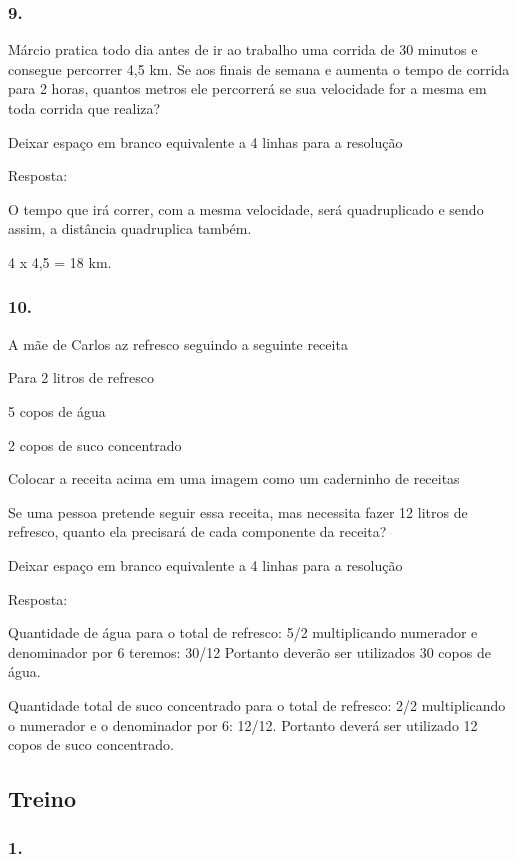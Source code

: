 \subsubsection{9.}\label{section-125}

Márcio pratica todo dia antes de ir ao trabalho uma corrida de 30
minutos e consegue percorrer 4,5 km. Se aos finais de semana e aumenta o
tempo de corrida para 2 horas, quantos metros ele percorrerá se sua
velocidade for a mesma em toda corrida que realiza?

Deixar espaço em branco equivalente a 4 linhas para a resolução

Resposta:

O tempo que irá correr, com a mesma velocidade, será quadruplicado e
sendo assim, a distância quadruplica também.

4 x 4,5 = 18 km.

\subsubsection{10.}\label{section-126}

A mãe de Carlos az refresco seguindo a seguinte receita

Para 2 litros de refresco

5 copos de água

2 copos de suco concentrado

Colocar a receita acima em uma imagem como um caderninho de receitas

Se uma pessoa pretende seguir essa receita, mas necessita fazer 12
litros de refresco, quanto ela precisará de cada componente da receita?

Deixar espaço em branco equivalente a 4 linhas para a resolução

Resposta:

Quantidade de água para o total de refresco: 5/2 multiplicando numerador
e denominador por 6 teremos: 30/12 Portanto deverão ser utilizados 30
copos de água.

Quantidade total de suco concentrado para o total de refresco: 2/2
multiplicando o numerador e o denominador por 6: 12/12. Portanto deverá
ser utilizado 12 copos de suco concentrado.

\subsection{Treino}\label{treino-9}

\subsubsection{1.}\label{section-127}

